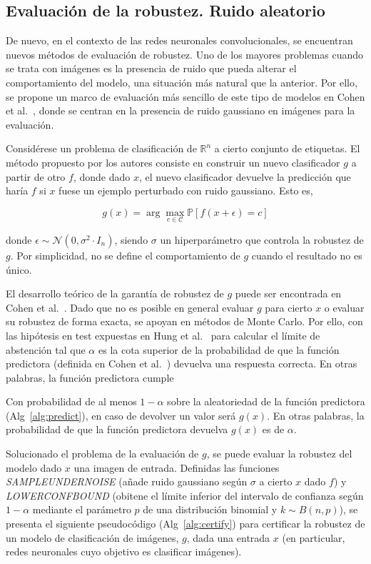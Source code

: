 \subsection*{Evaluación de la robustez. Ruido aleatorio}

De nuevo, en el contexto de las redes neuronales convolucionales, se encuentran nuevos métodos de evaluación de robustez. Uno de los mayores problemas cuando se trata con imágenes es la presencia de ruido que pueda alterar el comportamiento del modelo, una situación más natural que la anterior. Por ello, se propone un marco de evaluación más sencillo de este tipo de modelos en Cohen et al.~\cite{CertifRuido}, donde se centran en la presencia de ruido gaussiano en imágenes para la evaluación.

Considérese un problema de clasificación de $\mathbb{R}^n$ a cierto conjunto de etiquetas.  El método propuesto por los autores consiste en construir un nuevo clasificador $g$ a partir de otro $f$, donde dado $x$, el nuevo clasificador devuelve la predicción que haría $f$ si $x$ fuese un ejemplo perturbado con ruido gaussiano. Esto es,

$$g(x) = \arg \max_{c \in \mathcal{C}} \mathbb{P} \left[ f(x + \epsilon) = c \right]$$

donde $\epsilon \sim \mathcal{N} (0,\sigma^2 \cdot I_n)$, siendo $\sigma$ un hiperparámetro que controla la robustez de $g$. Por simplicidad, no se define el comportamiento de $g$ cuando el resultado no es único.

El desarrollo teórico de la garantía de robustez de $g$ puede ser encontrada en Cohen et al.~\cite{CertifRuido}. Dado que no es posible en general evaluar $g$ para cierto $x$ o evaluar su robustez de forma exacta, se apoyan en métodos de Monte Carlo. Por ello, con las hipótesis en test expuestas en Hung et al.~\cite{CertifRuido2} para calcular el límite de abstención tal que $\alpha$ es la cota superior de la probabilidad de que la función predictora (definida en Cohen et al.~\cite{CertifRuido}) devuelva una respuesta correcta. En otras palabras, la función predictora cumple

\begin{proposicion}
Con probabilidad de al menos $1 - \alpha$ sobre la aleatoriedad de la función predictora (Alg~\ref{alg:predict}), en caso de devolver un valor será $g(x)$. En otras palabras, la probabilidad de que la función predictora devuelva $g(x)$ es de $\alpha$.
\end{proposicion}

Solucionado el problema de la evaluación de $g$, se puede evaluar la robustez del modelo dado $x$ una imagen de entrada. Definidas las funciones \textit{SAMPLEUNDERNOISE} (añade ruido gaussiano según $\sigma$ a cierto $x$ dado $f$) y \textit{LOWERCONFBOUND} (obitene el límite inferior del intervalo de confianza según $1 - \alpha$ mediante el parámetro $p$ de una distribución binomial y $k \sim B(n,p)$), se presenta el siguiente pseudocódigo (Alg~\ref{alg:certify}) para certificar la robustez de un modelo de clasificación de imágenes, $g$, dada una entrada $x$ (en particular, redes neuronales cuyo objetivo es clasificar imágenes).

